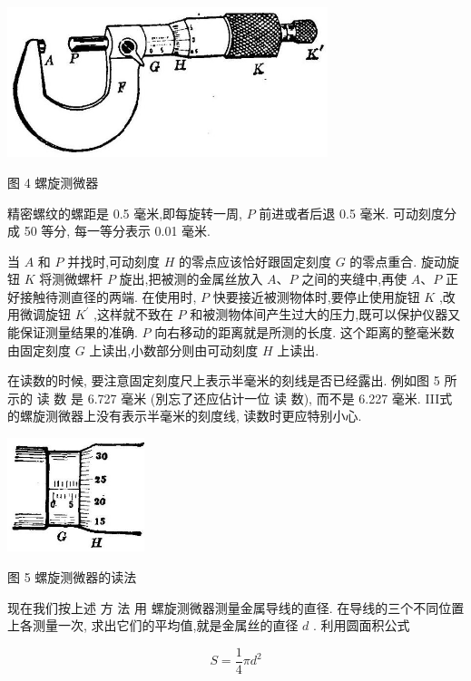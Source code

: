 \documentclass[10pt]{article}
\begin{document}
\begin{center}
\includegraphics[max width=0.7\textwidth]{images/01913056-1f15-74d8-9184-9aab52c9d66b_376_341027.jpg}
\end{center}

图 4 螺旋测微器

精密螺纹的螺距是 0.5 毫米,即每旋转一周, \(P\) 前进或者后退 0.5 毫米. 可动刻度分成 50 等分, 每一等分表示 0.01 毫米.

当 \(A\) 和 \(P\) 并找时,可动刻度 \(H\) 的零点应该恰好跟固定刻度 \(G\) 的零点重合. 旋动旋钮 \(K\) 将测微螺杆 \(P\) 旋出,把被测的金属丝放入 \(A\text{、}P\) 之间的夹缝中,再使 \(A\text{、}P\) 正好接触待测直径的两端. 在使用时, \(P\) 快要接近被测物体时,要停止使用旋钮 \(K\) ,改用微调旋钮 \({K}^{\prime }\) ,这样就不致在 \(P\) 和被测物体间产生过大的压力,既可以保护仪器又能保证测量结果的准确. \(P\) 向右移动的距离就是所测的长度. 这个距离的整毫米数由固定刻度 \(G\) 上读出,小数部分则由可动刻度 \(H\) 上读出.

在读数的时候, 要注意固定刻度尺上表示半毫米的刻线是否已经露出. 例如图 5 所示的 读 数 是 6.727 毫米 (別忘了还应佔计一位 读 数), 而不是 6.227 毫米. III式的螺旋测微器上没有表示半毫米的刻度线, 读数时更应特别小心.

\begin{center}
\includegraphics[max width=0.3\textwidth]{images/01913056-1f15-74d8-9184-9aab52c9d66b_377_323198.jpg}
\end{center}

图 5 螺旋测微器的读法

现在我们按上述 方 法 用 螺旋测微器测量金属导线的直径. 在导线的三个不同位置上各测量一次, 求出它们的平均值,就是金属丝的直径 \(d\) . 利用圆面积公式

\[
S = \frac{1}{4}\pi {d}^{2}
\]
\end{document}
